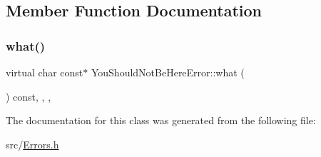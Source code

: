 \subsection{Member Function Documentation}
\mbox{\label{class_you_should_not_be_here_error_ae21a5eec0be24796dde99ca24fc7ade6}} 
\subsubsection{\texorpdfstring{what()}{what()}}
{\footnotesize\ttfamily virtual char const$\ast$ You\+Should\+Not\+Be\+Here\+Error\+::what (\begin{DoxyParamCaption}{ }\end{DoxyParamCaption}) const\hspace{0.3cm}{\ttfamily [inline]}, {\ttfamily [override]}, {\ttfamily [virtual]}, {\ttfamily [noexcept]}}



The documentation for this class was generated from the following file\+:\begin{DoxyCompactItemize}
\item 
src/\hyperlink{_errors_8h}{Errors.\+h}\end{DoxyCompactItemize}
